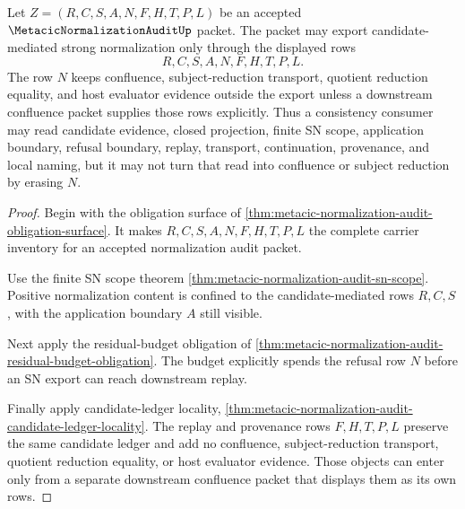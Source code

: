 \begin{theorem}
\label{thm:metacic-normalization-audit-confluence-refusal-split}
Let $Z=(R,C,S,A,N,F,H,T,P,L)$ be an accepted $\MetacicNormalizationAuditUp$ packet. The packet may export candidate-mediated strong normalization only through the displayed rows
$$
R,C,S,A,N,F,H,T,P,L .
$$
The row $N$ keeps confluence, subject-reduction transport, quotient reduction equality, and host evaluator evidence outside the export unless a downstream confluence packet supplies those rows explicitly. Thus a consistency consumer may read candidate evidence, closed projection, finite SN scope, application boundary, refusal boundary, replay, transport, continuation, provenance, and local naming, but it may not turn that read into confluence or subject reduction by erasing $N$.
\end{theorem}
\begin{proof}
Begin with the obligation surface of \autoref{thm:metacic-normalization-audit-obligation-surface}. It makes $R,C,S,A,N,F,H,T,P,L$ the complete carrier inventory for an accepted normalization audit packet.

Use the finite SN scope theorem \autoref{thm:metacic-normalization-audit-sn-scope}. Positive normalization content is confined to the candidate-mediated rows $R,C,S$, with the application boundary $A$ still visible.

Next apply the residual-budget obligation of \autoref{thm:metacic-normalization-audit-residual-budget-obligation}. The budget explicitly spends the refusal row $N$ before an SN export can reach downstream replay.

Finally apply candidate-ledger locality, \autoref{thm:metacic-normalization-audit-candidate-ledger-locality}. The replay and provenance rows $F,H,T,P,L$ preserve the same candidate ledger and add no confluence, subject-reduction transport, quotient reduction equality, or host evaluator evidence. Those objects can enter only from a separate downstream confluence packet that displays them as its own rows.
\end{proof}

